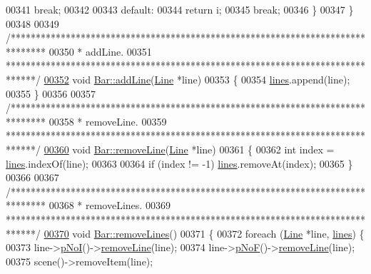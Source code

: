 \begin{DoxyCode}
00341     \textcolor{keywordflow}{break};
00342 
00343   \textcolor{keywordflow}{default}:
00344     \textcolor{keywordflow}{return} i;
00345     \textcolor{keywordflow}{break};
00346   \}
00347 \}
00348 
00349 \textcolor{comment}{/*******************************************************************************}
00350 \textcolor{comment}{ * addLine.}
00351 \textcolor{comment}{ ******************************************************************************/}
\hypertarget{bar_8cpp_source_l00352}{}\hyperlink{group___models_ga8cbd2f62d92e69ce6c8d561b682464b6}{00352} \textcolor{keywordtype}{void} \hyperlink{group___models_ga8cbd2f62d92e69ce6c8d561b682464b6}{Bar::addLine}(\hyperlink{class_line}{Line} *line)
00353 \{
00354   \hyperlink{class_bar_a23b6d4319352ef0e77ad66aade4e0209}{lines}.append(line);
00355 \}
00356 
00357 \textcolor{comment}{/*******************************************************************************}
00358 \textcolor{comment}{ * removeLine.}
00359 \textcolor{comment}{ ******************************************************************************/}
\hypertarget{bar_8cpp_source_l00360}{}\hyperlink{group___models_ga2536c0e5cb97fb627b3520826ece2c99}{00360} \textcolor{keywordtype}{void} \hyperlink{group___models_ga2536c0e5cb97fb627b3520826ece2c99}{Bar::removeLine}(\hyperlink{class_line}{Line} *line)
00361 \{
00362   \textcolor{keywordtype}{int} index = \hyperlink{class_bar_a23b6d4319352ef0e77ad66aade4e0209}{lines}.indexOf(line);
00363 
00364   \textcolor{keywordflow}{if} (index != -1) \hyperlink{class_bar_a23b6d4319352ef0e77ad66aade4e0209}{lines}.removeAt(index);
00365 \}
00366 
00367 \textcolor{comment}{/*******************************************************************************}
00368 \textcolor{comment}{ * removeLines.}
00369 \textcolor{comment}{ ******************************************************************************/}
\hypertarget{bar_8cpp_source_l00370}{}\hyperlink{group___models_ga4ea1a2074cb45968d80d6add571884a4}{00370} \textcolor{keywordtype}{void} \hyperlink{group___models_ga4ea1a2074cb45968d80d6add571884a4}{Bar::removeLines}()
00371 \{
00372   \textcolor{keywordflow}{foreach} (\hyperlink{class_line}{Line} *line, \hyperlink{class_bar_a23b6d4319352ef0e77ad66aade4e0209}{lines}) \{
00373     line->\hyperlink{group___models_gaeafd90e84ac2f8de2a879abe9e53eef3}{pNoI}()->\hyperlink{group___models_ga2536c0e5cb97fb627b3520826ece2c99}{removeLine}(line);
00374     line->\hyperlink{group___models_gabbc73ddedd3075c33ae5331bd7c9829f}{pNoF}()->\hyperlink{group___models_ga2536c0e5cb97fb627b3520826ece2c99}{removeLine}(line);
00375     scene()->removeItem(line);

\end{DoxyCode}
